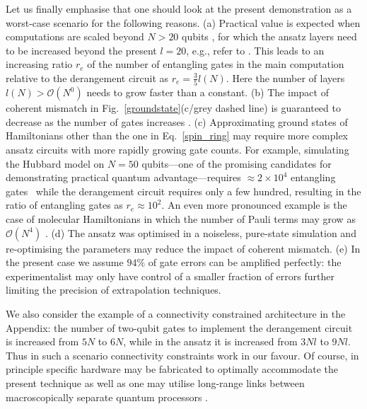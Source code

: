 \documentclass[aps,prx,showpacs,twocolumn,reprint]{revtex4-2}
\begin{document}
{Let us finally emphasise that one should look at the present demonstration as a worst-case scenario
for the following reasons.
(a) Practical value is expected when computations are scaled
beyond $N>20$ qubits \cite{spin_ring_hamil,childs2018toward}, for which the
ansatz layers need to be increased beyond the present $l=20$,
e.g., refer to \cite{niu2019optimizing,zhou2020quantum,PRXQuantum.1.020319}.
This leads to an increasing ratio $r_{e}$ of the number of entangling gates in the main computation relative
to the derangement circuit as $r_{e} = \frac{3}{5} l(N)$. Here the number of layers $l(N) > \mathcal{O}(N^{0})$
needs to grow faster than a constant. 
(b) The impact of coherent mismatch in Fig.~\ref{groundstate}(c/grey dashed line) is guaranteed to
decrease as the number of gates increases \cite{koczor2021dominant}.
(c) Approximating ground states of Hamiltonians other than the one in Eq.~\ref{spin_ring} may require
more complex ansatz circuits with more rapidly growing gate counts.
For example, simulating the Hubbard model on $N=50$ qubits---one of the promising
candidates for demonstrating practical quantum advantage---requires $\approx 2\times10^4$ entangling
gates~\cite{PhysRevApplied.14.014059}
while the derangement circuit requires only a few hundred, resulting in the ratio of entangling gates as $r_e\approx10^2$.
An even more pronounced example is the case of molecular Hamiltonians in which the number of
Pauli terms may grow as $\mathcal{O}(N^4)$ \cite{ourReview}.
(d) The ansatz was optimised in a noiseless, pure-state simulation and re-optimising the
parameters may reduce the impact of coherent mismatch.
(e) In the present case we assume $94\%$ of gate errors can be amplified perfectly:
the experimentalist may only have control of a smaller fraction of errors further limiting
the precision of extrapolation techniques.


We also consider the example of a connectivity constrained architecture in the Appendix: the number
of two-qubit gates to implement the derangement circuit is increased from $5N$ to $6N$, while in the
ansatz it is increased from $3Nl$ to $9Nl$. Thus in such a
scenario connectivity constraints work in our favour. Of course, in principle specific hardware
may be fabricated to optimally accommodate the present technique as well as one may
utilise long-range links between macroscopically separate quantum processors \cite{PhysRevLett.124.110501}.










}
\end{document}
